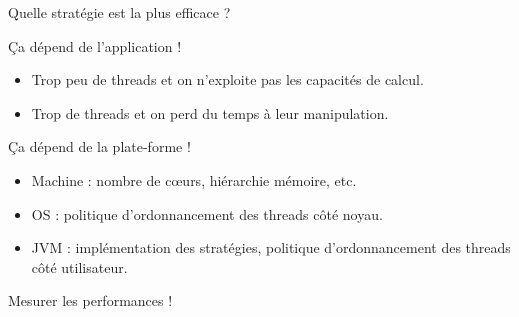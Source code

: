 
\begingroup

\begin{frame}{Quelle stratégie est la plus efficace ?}

  \begin{block}{Ça dépend de l'application !} 
    \begin{itemize}
    \item Trop peu de threads et on n'exploite pas les capacités de calcul. 
    \item Trop de threads et on perd du temps à leur manipulation.
    \end{itemize}
  \end{block}
  
  \begin{block}{Ça dépend de la plate-forme !}
    \begin{itemize}
    \item Machine : nombre de c{\oe}urs, hiérarchie mémoire, etc.
    \item OS : politique d'ordonnancement des threads côté noyau.
    \item JVM : implémentation des stratégies, politique d'ordonnancement des threads côté utilisateur.
    \end{itemize}
  \end{block}
  
  \begin{center}
    \alert{Mesurer les performances !}
  \end{center}

\end{frame}

\endgroup
\endinput
